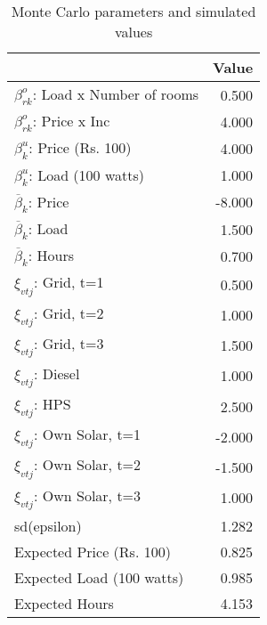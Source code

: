 \begin{table}[!ht]
	\centering
		\caption{Monte Carlo parameters and simulated values}
\begin{tabular}{lr}
		\toprule
               &     Value\\
		\midrule
		$\beta^o_{rk}$: Load x Number of rooms&     0.500\\
		$\beta^o_{rk}$: Price x Inc&     4.000\\
		$\beta^u_{k}$: Price (Rs. 100)&     4.000\\
		$\beta^u_{k}$: Load (100 watts)&     1.000\\
		$\overline{\beta}_k$: Price&    -8.000\\
		$\overline{\beta}_k$: Load&     1.500\\
		$\overline{\beta}_k$: Hours&     0.700\\
		$\xi_{vtj}$: Grid, t=1&     0.500\\
		$\xi_{vtj}$: Grid, t=2&     1.000\\
		$\xi_{vtj}$: Grid, t=3&     1.500\\
		$\xi_{vtj}$: Diesel&     1.000\\
		$\xi_{vtj}$: HPS&     2.500\\
		$\xi_{vtj}$: Own Solar, t=1&    -2.000\\
		$\xi_{vtj}$: Own Solar, t=2&    -1.500\\
		$\xi_{vtj}$: Own Solar, t=3&     1.000\\
		    sd(epsilon)&     1.282\\
		Expected Price (Rs. 100)&     0.825\\
		Expected Load (100 watts)&     0.985\\
		 Expected Hours&     4.153\\
		\bottomrule
	\end{tabular}
\end{table}

